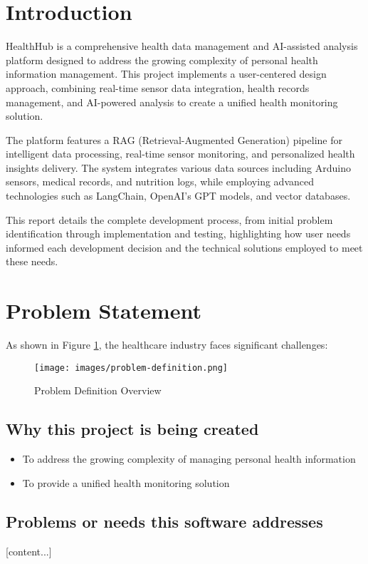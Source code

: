 \section{Introduction}

HealthHub is a comprehensive health data management and AI-assisted analysis platform designed to address the growing complexity of personal health information management. This project implements a user-centered design approach, combining real-time sensor data integration, health records management, and AI-powered analysis to create a unified health monitoring solution.

The platform features a RAG (Retrieval-Augmented Generation) pipeline for intelligent data processing, real-time sensor monitoring, and personalized health insights delivery. The system integrates various data sources including Arduino sensors, medical records, and nutrition logs, while employing advanced technologies such as LangChain, OpenAI's GPT models, and vector databases.

This report details the complete development process, from initial problem identification through implementation and testing, highlighting how user needs informed each development decision and the technical solutions employed to meet these needs. 

\section{Problem Statement}
As shown in Figure \ref{fig:problem-definition}, the healthcare industry faces significant challenges:

\begin{figure}[H]
    \centering
    \texttt{[image: images/problem-definition.png]}
    \caption{Problem Definition Overview}
    \label{fig:problem-definition}
\end{figure}

\subsection{Why this project is being created}
\begin{itemize}
    \item To address the growing complexity of managing personal health information
    \item To provide a unified health monitoring solution
\end{itemize}

\subsection{Problems or needs this software addresses}
[content...]

